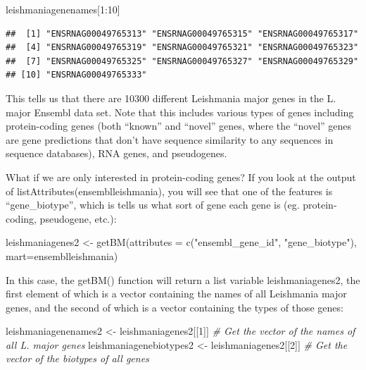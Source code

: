 \documentclass[
]{book}
\newenvironment{Shaded}{\begin{snugshade}}{\end{snugshade}}
\newcommand{\AttributeTok}[1]{\textcolor[rgb]{0.77,0.63,0.00}{#1}}
\newcommand{\CommentTok}[1]{\textcolor[rgb]{0.56,0.35,0.01}{\textit{#1}}}
\newcommand{\DecValTok}[1]{\textcolor[rgb]{0.00,0.00,0.81}{#1}}
\newcommand{\FunctionTok}[1]{\textcolor[rgb]{0.00,0.00,0.00}{#1}}
\newcommand{\NormalTok}[1]{#1}
\newcommand{\OtherTok}[1]{\textcolor[rgb]{0.56,0.35,0.01}{#1}}
\newcommand{\SpecialCharTok}[1]{\textcolor[rgb]{0.00,0.00,0.00}{#1}}
\newcommand{\StringTok}[1]{\textcolor[rgb]{0.31,0.60,0.02}{#1}}
\begin{document}
\begin{Shaded}
\begin{Highlighting}[]
\NormalTok{leishmaniagenenames[}\DecValTok{1}\SpecialCharTok{:}\DecValTok{10}\NormalTok{]}
\end{Highlighting}
\end{Shaded}

\begin{verbatim}
##  [1] "ENSRNAG00049765313" "ENSRNAG00049765315" "ENSRNAG00049765317"
##  [4] "ENSRNAG00049765319" "ENSRNAG00049765321" "ENSRNAG00049765323"
##  [7] "ENSRNAG00049765325" "ENSRNAG00049765327" "ENSRNAG00049765329"
## [10] "ENSRNAG00049765333"
\end{verbatim}

This tells us that there are 10300 different Leishmania major genes in the L. major Ensembl data set. Note that this includes various types of genes including protein-coding genes (both ``known'' and ``novel'' genes, where the ``novel'' genes are gene predictions that don't have sequence similarity to any sequences in sequence databases), RNA genes, and pseudogenes.

What if we are only interested in protein-coding genes? If you look at the output of listAttributes(ensemblleishmania), you will see that one of the features is ``gene\_biotype'', which is tells us what sort of gene each gene is (eg. protein-coding, pseudogene, etc.):

\begin{Shaded}
\begin{Highlighting}[]
\NormalTok{leishmaniagenes2 }\OtherTok{\textless{}{-}} \FunctionTok{getBM}\NormalTok{(}\AttributeTok{attributes =} \FunctionTok{c}\NormalTok{(}\StringTok{"ensembl\_gene\_id"}\NormalTok{, }\StringTok{"gene\_biotype"}\NormalTok{), }\AttributeTok{mart=}\NormalTok{ensemblleishmania)}
\end{Highlighting}
\end{Shaded}

In this case, the getBM() function will return a list variable leishmaniagenes2, the first element of which is a vector containing the names of all Leishmania major genes, and the second of which is a vector containing the types of those genes:

\begin{Shaded}
\begin{Highlighting}[]
\NormalTok{leishmaniagenenames2 }\OtherTok{\textless{}{-}}\NormalTok{ leishmaniagenes2[[}\DecValTok{1}\NormalTok{]] }\CommentTok{\# Get the vector of the names of all L. major genes}
\NormalTok{leishmaniagenebiotypes2 }\OtherTok{\textless{}{-}}\NormalTok{ leishmaniagenes2[[}\DecValTok{2}\NormalTok{]] }\CommentTok{\# Get the vector of the biotypes of all genes}
\end{Highlighting}
\end{Shaded}
\end{document}
